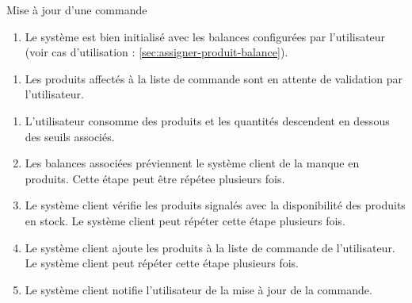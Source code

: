 ﻿\begin{UseCase}{Mise à jour d'une commande}



\begin{UseCasePre}
    \begin{enumerate}
        \item Le système est bien initialisé avec les balances configurées par
            l'utilisateur (voir cas d'utilisation :
            \ref{sec:assigner-produit-balance}).
    \end{enumerate}
\end{UseCasePre}

\begin{UseCasePost}
    \begin{enumerate}
        \item Les produits affectés à la liste de commande sont en attente de
            validation par l'utilisateur.
    \end{enumerate}
\end{UseCasePost}

\begin{UseCaseScenario}
    \begin{enumerate}
        \item L'utilisateur consomme des produits et les quantités descendent
            en dessous des seuils associés.
        \item Les balances associées préviennent le système client de la manque
            en produits. Cette étape peut être répétee plusieurs fois.
        \item Le système client vérifie les produits signalés avec la
            disponibilité des produits en stock. Le système client peut répéter
            cette étape plusieurs fois.
        \item Le système client ajoute les produits à la liste de commande de
            l'utilisateur. Le système client peut répéter cette étape plusieurs
            fois.
        \item Le système client notifie l'utilisateur de la mise à jour de la
            commande.
    \end{enumerate}
\end{UseCaseScenario}


\end{UseCase}
